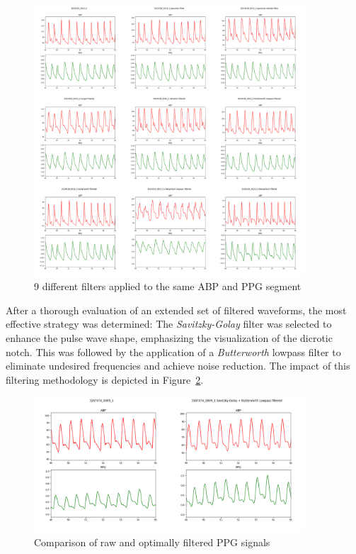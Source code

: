 \begin{figure}[h]
    \includegraphics[width=0.9\textwidth]{images/methods/filters}
    \caption{9 different filters applied to the same ABP and PPG segment}
    \label{fig:filters}
\end{figure}

After a thorough evaluation of an extended set of filtered waveforms, the most effective strategy was determined:
The \textit{Savitzky-Golay} filter was selected to enhance the pulse wave shape, emphasizing the visualization of the dicrotic notch.
This was followed by the application of a \textit{Butterworth} lowpass filter to eliminate undesired frequencies and achieve noise reduction.
The impact of this filtering methodology is depicted in Figure~\ref{fig:opt_filtering}.

\begin{figure}[h]
    \includegraphics[width=0.9\textwidth]{images/methods/opt_filtering}
    \caption{Comparison of raw and optimally filtered PPG signals}
    \label{fig:opt_filtering}
\end{figure}

